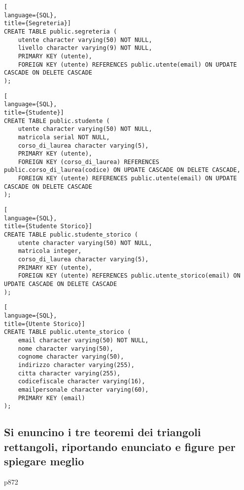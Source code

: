 \documentclass{article}
\begin{document}
\begin{lstlisting}[
language={SQL},
title={Segreteria}]
CREATE TABLE public.segreteria (
    utente character varying(50) NOT NULL,
    livello character varying(9) NOT NULL,
    PRIMARY KEY (utente),
    FOREIGN KEY (utente) REFERENCES public.utente(email) ON UPDATE CASCADE ON DELETE CASCADE
);
\end{lstlisting}

\begin{lstlisting}[
language={SQL},
title={Studente}]
CREATE TABLE public.studente (
    utente character varying(50) NOT NULL,
    matricola serial NOT NULL,
    corso_di_laurea character varying(5),
    PRIMARY KEY (utente),
    FOREIGN KEY (corso_di_laurea) REFERENCES public.corso_di_laurea(codice) ON UPDATE CASCADE ON DELETE CASCADE,
    FOREIGN KEY (utente) REFERENCES public.utente(email) ON UPDATE CASCADE ON DELETE CASCADE
);

\end{lstlisting}

\begin{lstlisting}[
language={SQL},
title={Studente Storico}]
CREATE TABLE public.studente_storico (
    utente character varying(50) NOT NULL,
    matricola integer,
    corso_di_laurea character varying(5),
    PRIMARY KEY (utente),
    FOREIGN KEY (utente) REFERENCES public.utente_storico(email) ON UPDATE CASCADE ON DELETE CASCADE
);
\end{lstlisting}

\begin{lstlisting}[
language={SQL},
title={Utente Storico}]
CREATE TABLE public.utente_storico (
    email character varying(50) NOT NULL,
    nome character varying(50),
    cognome character varying(50),
    indirizzo character varying(255),
    citta character varying(255),
    codicefiscale character varying(16),
    emailpersonale character varying(60),
    PRIMARY KEY (email)
);
\end{lstlisting}

















\subsection{Si enuncino i tre teoremi dei triangoli rettangoli, riportando enunciato e figure per spiegare meglio} \hspace{50} p872
\end{document}
